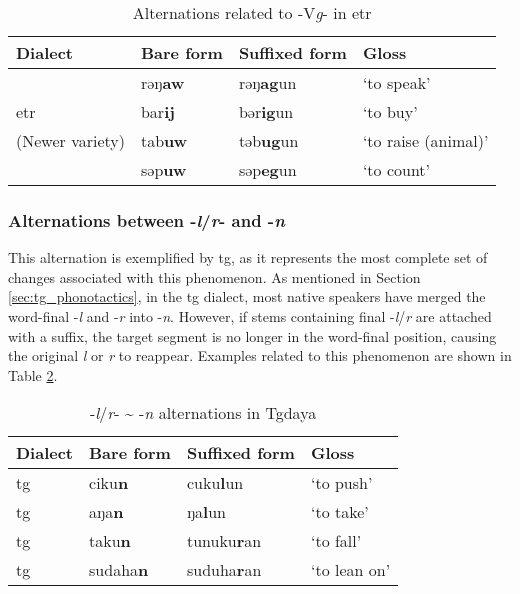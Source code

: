 \begin{table}[!htbp]
\centering
\caption{Alternations related to -V\textit{g}- in \acl{etr}}
\label{tab:Vg_alt_etr}
\begin{tabular}{llll}
\hline
Dialect                   & Bare form      & Suffixed form    & Gloss      \\ \hline
                          & rəŋ\textbf{aw}  & rəŋ\textbf{ag}un & `to speak'          \\
        \acl{etr}         & bar\textbf{ij} & bər\textbf{ig}un & `to buy'            \\
     (Newer variety)      & tab\textbf{uw} & təb\textbf{ug}un & `to raise (animal)' \\
                          & səp\textbf{uw} & səp\textbf{eg}un & `to count'          \\ \hline
\end{tabular}
\end{table}

\subsubsection{Alternations between -\textit{l}/\textit{r}- and -\textit{n}}

This alternation is exemplified by \acl{tg}, as it represents the most complete set of changes associated with this phenomenon. As mentioned in Section \ref{sec:tg_phonotactics}, in the \acl{tg} dialect, most native speakers have merged the word-final -\textit{l} and -\textit{r} into -\textit{n}. However, if stems containing final -\textit{l}/\textit{r} are attached with a suffix, the target segment is no longer in the word-final position, causing the original \textit{l} or \textit{r} to reappear. Examples related to this phenomenon are shown in Table \ref{tab:lrn_alt}.

\begin{table}[!htbp]
\centering
\caption{-\textit{l}/\textit{r}- \~{}  -\textit{n} alternations in Tgdaya}
\label{tab:lrn_alt}
\begin{tabular}{llll}
\hline
Dialect  & Bare form & Suffixed form & Gloss        \\ \hline
\acl{tg} & ciku\textbf{n}     & cuku\textbf{l}un      & `to push'    \\
\acl{tg} & aŋa\textbf{n}      & ŋa\textbf{l}un        & `to take'    \\
\acl{tg} & taku\textbf{n}     & tunuku\textbf{r}an    & `to fall'    \\
\acl{tg} & sudaha\textbf{n}   & suduha\textbf{r}an    & `to lean on' \\\hline
\end{tabular}
\end{table}

